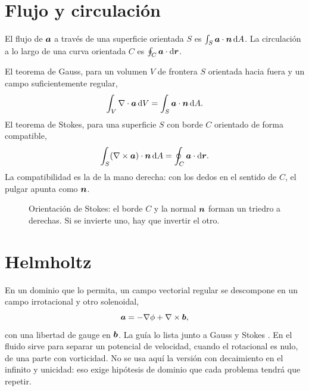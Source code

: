 \section{Flujo y circulación}

El flujo de \(\boldsymbol{a}\) a través de una superficie orientada \(S\) es \(\int_S\boldsymbol{a}\cdot\boldsymbol{n}\,\mathrm{d}A\). La circulación a lo largo de una curva orientada \(C\) es \(\oint_C\boldsymbol{a}\cdot\mathrm{d}\boldsymbol{r}\).

El teorema de Gauss, para un volumen \(V\) de frontera \(S\) orientada hacia fuera y un campo suficientemente regular,
\begin{equation}
\label{eq:gauss}
\int_V\nabla\cdot\boldsymbol{a}\,\mathrm{d}V=\int_S\boldsymbol{a}\cdot\boldsymbol{n}\,\mathrm{d}A.
\end{equation}
El teorema de Stokes, para una superficie \(S\) con borde \(C\) orientado de forma compatible,
\begin{equation}
\label{eq:stokes}
\int_S(\nabla\times\boldsymbol{a})\cdot\boldsymbol{n}\,\mathrm{d}A=\oint_C\boldsymbol{a}\cdot\mathrm{d}\boldsymbol{r}.
\end{equation}
La compatibilidad es la de la mano derecha: con los dedos en el sentido de \(C\), el pulgar apunta como \(\boldsymbol{n}\).

\begin{figure}[ht]
\centering
{}
\caption{Orientación de Stokes: el borde \(C\) y la normal \(\boldsymbol{n}\) forman un triedro a derechas. Si se invierte uno, hay que invertir el otro.}
\label{fig:stokes-orientacion}
\end{figure}

\section{Helmholtz}

En un dominio que lo permita, un campo vectorial regular se descompone en un campo irrotacional y otro solenoidal,
\begin{equation}
\label{eq:helmholtz}
\boldsymbol{a}=-\nabla\phi+\nabla\times\boldsymbol{b},
\end{equation}
con una libertad de gauge en \(\boldsymbol{b}\). La guía lo lista junto a Gauss y Stokes \parencite{uleGuia2026}. En el fluido sirve para separar un potencial de velocidad, cuando el rotacional es nulo, de una parte con vorticidad. No se usa aquí la versión con decaimiento en el infinito y unicidad: eso exige hipótesis de dominio que cada problema tendrá que repetir.


